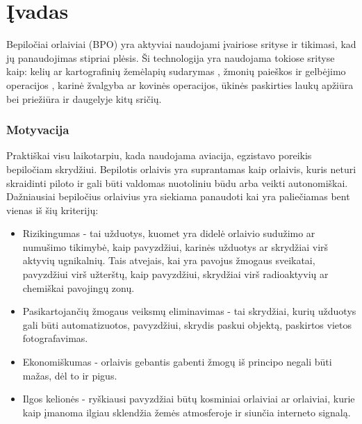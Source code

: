\documentclass[a4paper,12pt]{article}
\begin{document}
				
	\clearpage
	
	\section*{Įvadas}
		Bepiločiai orlaiviai (\gls{BPO}) yra aktyviai naudojami įvairiose srityse ir tikimasi, kad jų panaudojimas stipriai plėsis. Ši technologija yra naudojama tokiose srityse kaip: kelių ar kartografinių žemėlapių sudarymas \cite{RoadDetection12}, žmonių paieškos ir gelbėjimo operacijos \cite{WildernessSearchAndRescue}, karinė žvalgyba ar kovinės operacijos, ūkinės paskirties laukų apžiūra bei priežiūra ir daugelyje kitų sričių.
			
		\subsubsection*{Motyvacija}
			
		Praktiškai visu laikotarpiu, kada naudojama aviacija, egzistavo poreikis bepiločiam skrydžiui. Bepilotis orlaivis yra suprantamas kaip orlaivis, kuris neturi skraidinti piloto ir gali būti valdomas nuotoliniu būdu arba veikti autonomiškai. Dažniausiai bepiločius orlaivius yra siekiama panaudoti kai yra paliečiamas bent vienas iš šių kriterijų: 		
		\begin{itemize}
			\item Rizikingumas - tai užduotys, kuomet yra didelė orlaivio sudužimo ar numušimo tikimybė, kaip pavyzdžiui, karinės užduotys ar skrydžiai virš aktyvių ugnikalnių. Tais atvejais, kai yra pavojus žmogaus sveikatai, pavyzdžiui virš užterštų, kaip pavyzdžiui, skrydžiai virš radioaktyvių ar chemiškai pavojingų zonų. 
			\item Pasikartojančių žmogaus veiksmų eliminavimas - tai skrydžiai, kurių užduotys gali būti automatizuotos, pavyzdžiui, skrydis paskui objektą, paskirtos vietos fotografavimas.
			\item Ekonomiškumas - orlaivis gebantis gabenti žmogų iš principo negali būti mažas, dėl to ir pigus.
			\item Ilgos kelionės - ryškiausi pavyzdžiai būtų kosminiai orlaiviai ar orlaiviai, kurie kaip įmanoma ilgiau sklendžia žemės atmosferoje ir siunčia interneto signalą. 
		\end{itemize}
		
\end{document}
